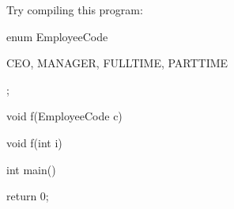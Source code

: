 Try compiling this program:



\begin{consolethree}[escapeinside=||]

enum EmployeeCode

{

    CEO, MANAGER, FULLTIME, PARTTIME

};



void f(EmployeeCode c)

{}



void f(int i)

{}



int main()

{

    return 0;

}

\end{consolethree}

